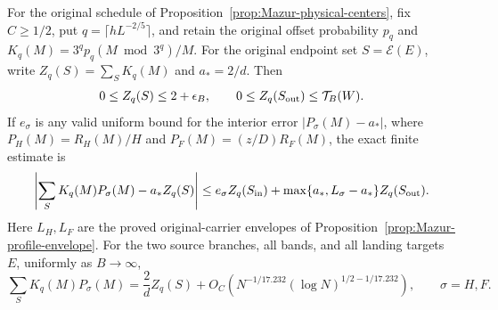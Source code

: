 \begin{proposition}
\label{prop:Mazur-full-profile}
For the original schedule of Proposition~\ref{prop:Mazur-physical-centers},
fix $C\ge1/2$, put
$q=\lceil hL^{-2/5}\rceil$, and retain the original offset probability
$p_q$ and $K_q(M)=3^qp_q(M\bmod3^q)/M$.
For the original endpoint set $S=\mathcal E(E)$, write
$Z_q(S)=\sum_SK_q(M)$ and $a_*=2/d$.
Then
\[
 0\le Z_q(S)\le2+\epsilon_B,\qquad
 0\le Z_q(S_{\rm out})\le\mathcal T_B(W).
\]
If $e_\sigma$ is any valid uniform bound for the interior error
$|P_\sigma(M)-a_*|$, where $P_H(M)=R_H(M)/H$ and
$P_F(M)=(z/D)R_F(M)$, the exact finite estimate is
\begin{equation}
 \left|\sum_SK_q(M)P_\sigma(M)-a_*Z_q(S)\right|
 \le e_\sigma Z_q(S_{\rm in})
    +\max\{a_*,L_\sigma-a_*\}Z_q(S_{\rm out}).
 \label{eq:Mazur-full-finite}
\end{equation}
Here $L_H,L_F$ are the proved original-carrier envelopes of
Proposition~\ref{prop:Mazur-profile-envelope}.
For the two source branches, all bands, and all landing targets $E$,
uniformly as $B\to\infty$,
\begin{equation}
 \sum_SK_q(M)P_\sigma(M)
 =\frac2d Z_q(S)+
 O_C\!\left(N^{-1/17.232}(\log N)^{1/2-1/17.232}\right),
 \qquad \sigma=H,F.
 \label{eq:Mazur-full-profile-rate}
\end{equation}
\end{proposition}
